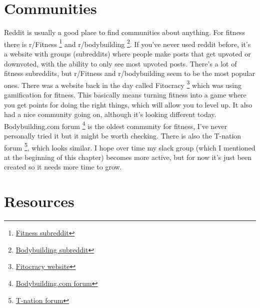 \documentclass[openany, 12pt]{book}
\begin{document}
        \section{Communities}

        Reddit is usually a good place to find communities about anything. For fitness there is r/Fitness
        \footnote{\href{https://www.reddit.com/r/Fitness/}{Fitness subreddit}}
        and r/bodybuilding
        \footnote{\href{https://www.reddit.com/r/bodybuilding/}{Bodybuilding subreddit}}. If you've never used reddit before, it's a website with groups (subreddits) where people make
        posts that get upvoted or downvoted, with the ability to only see most upvoted posts. There's a lot of fitness subreddits, but r/Fitness and r/bodybuilding seem to be the most
        popular ones. There was a website back in the day called Fitocracy
        \footnote{\href{https://www.fitocracy.com/}{Fitocracy website}} which was using gamification for fitness. This basically means turning fitness into a game where you get points for
        doing the right things, which will allow you to level up. It also had a nice community going on, although it's looking different today. Bodybuilding.com forum
        \footnote{\href{https://forum.bodybuilding.com/index.php}{Bodybuilding.com forum}} is the oldest community for fitness, I've never personally tried it but it might be worth checking.
        There is also the T-nation forum
        \footnote{\href{https://forums.t-nation.com/}{T-nation forum}}, which looks similar. I hope over time my slack group (which I mentioned at the beginning of this chapter) 
        becomes more active, but for now it's just been created so it needs more time to grow.
        
        \section{Resources}
\end{document}
